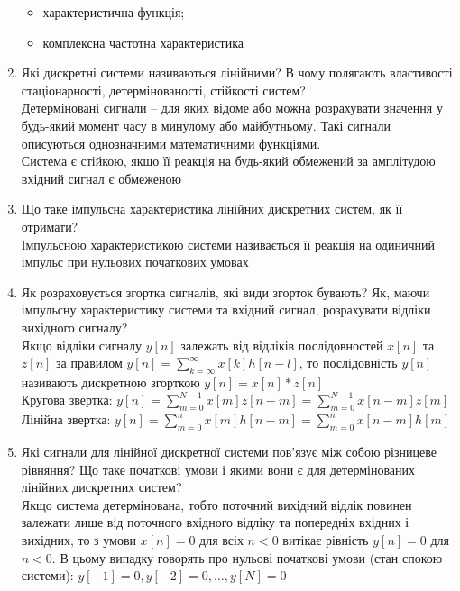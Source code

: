 \begin{enumerate}
\begin{itemize}
                  \item характеристична функція;
                  \item комплексна частотна характеристика
            \end{itemize}
      \item Які дискретні системи називаються лінійними? В чому полягають
            властивості стаціонарності, детермінованості, стійкості систем? \\
            Детерміновані сигнали – для яких відоме або можна розрахувати значення
            у будь-який момент часу в минулому або майбутньому.
            Такі сигнали описуються однозначними математичними функціями. \\
            Система є стійкою, якщо її реакція на будь-який обмежений
            за амплітудою вхідний сигнал є обмеженою
      \item Що таке імпульсна характеристика лінійних дискретних систем, як
            її отримати? \\
            Імпульсною характеристикою системи називається її реакція
            на одиничний імпульс при нульових початкових умовах
      \item Як розраховується згортка сигналів, які види згорток бувають? Як,
            маючи імпульсну характеристику системи та вхідний сигнал, розрахувати
            відліки вихідного сигналу? \\
            Якщо відліки сигналу $y[n]$ залежать від відліків послідовностей
            $x[n]$ та $z[n]$ за правилом
            $y[n] = \sum_{k = \infty}^{\infty} x[k] h[n - l]$,
            то послідовність $y[n]$ називають дискретною згорткою $y[n] = x[n] * z[n]$ \\
            Кругова звертка:
            $y[n] = \sum_{m = 0}^{N - 1} x[m] z[n - m] = \sum_{m = 0}^{N - 1} x[n - m] z[m]$ \\
            Лінійна звертка:
            $y[n] = \sum_{m = 0}^{n} x[m] h[n - m] = \sum_{m = 0}^{n} x[n - m] h[m]$
      \item Які сигнали для лінійної дискретної системи пов’язує між собою
            різницеве рівняння? Що таке початкові умови і якими вони є для
            детермінованих лінійних дискретних систем? \\
            Якщо система детермінована, тобто поточний вихідний відлік повинен залежати
            лише від поточного вхідного відліку та попередніх вхідних і вихідних, то з умови
            $x[n] = 0$ для всіх $n < 0$ витікає рівність $y[n] = 0$ для $n < 0$.
            В цьому випадку говорять про нульові початкові умови (стан спокою системи):
            $y[-1] = 0, y[-2] = 0, \dots, y[N] = 0$
\end{enumerate}

